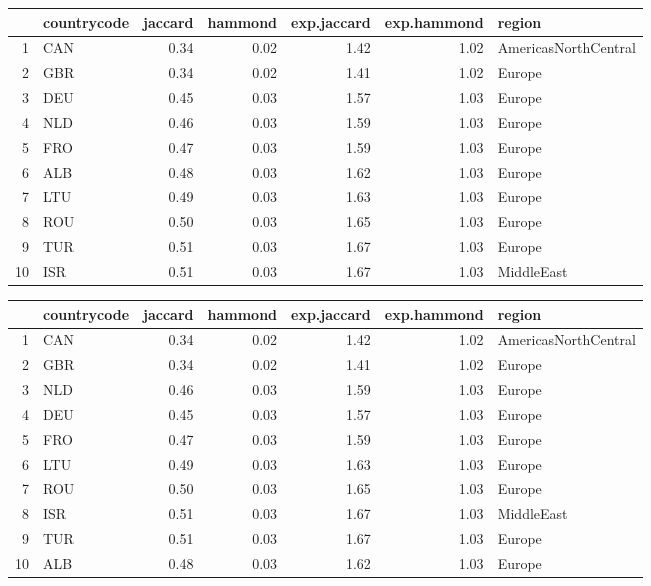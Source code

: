 \documentclass[10pt,a4paper]{article}
\begin{document}
\begin{table}[ht]
\centering
\begin{tabular}{rlrrrrl}
  \hline
 & countrycode & jaccard & hammond & exp.jaccard & exp.hammond & region \\ 
  \hline
1 & CAN & 0.34 & 0.02 & 1.42 & 1.02 & AmericasNorthCentral \\ 
  2 & GBR & 0.34 & 0.02 & 1.41 & 1.02 & Europe \\ 
  3 & DEU & 0.45 & 0.03 & 1.57 & 1.03 & Europe \\ 
  4 & NLD & 0.46 & 0.03 & 1.59 & 1.03 & Europe \\ 
  5 & FRO & 0.47 & 0.03 & 1.59 & 1.03 & Europe \\ 
  6 & ALB & 0.48 & 0.03 & 1.62 & 1.03 & Europe \\ 
  7 & LTU & 0.49 & 0.03 & 1.63 & 1.03 & Europe \\ 
  8 & ROU & 0.50 & 0.03 & 1.65 & 1.03 & Europe \\ 
  9 & TUR & 0.51 & 0.03 & 1.67 & 1.03 & Europe \\ 
  10 & ISR & 0.51 & 0.03 & 1.67 & 1.03 & MiddleEast \\ 
   \hline
\end{tabular}
\end{table}

\begin{table}[ht]
\centering
\begin{tabular}{rlrrrrl}
  \hline
 & countrycode & jaccard & hammond & exp.jaccard & exp.hammond & region \\ 
  \hline
1 & CAN & 0.34 & 0.02 & 1.42 & 1.02 & AmericasNorthCentral \\ 
  2 & GBR & 0.34 & 0.02 & 1.41 & 1.02 & Europe \\ 
  3 & NLD & 0.46 & 0.03 & 1.59 & 1.03 & Europe \\ 
  4 & DEU & 0.45 & 0.03 & 1.57 & 1.03 & Europe \\ 
  5 & FRO & 0.47 & 0.03 & 1.59 & 1.03 & Europe \\ 
  6 & LTU & 0.49 & 0.03 & 1.63 & 1.03 & Europe \\ 
  7 & ROU & 0.50 & 0.03 & 1.65 & 1.03 & Europe \\ 
  8 & ISR & 0.51 & 0.03 & 1.67 & 1.03 & MiddleEast \\ 
  9 & TUR & 0.51 & 0.03 & 1.67 & 1.03 & Europe \\ 
  10 & ALB & 0.48 & 0.03 & 1.62 & 1.03 & Europe \\ 
   \hline
\end{tabular}
\end{table}
\end{document}
